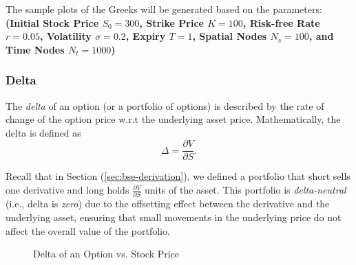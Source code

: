 The sample plots of the Greeks will be generated based on the parameters: 
\textbf{(Initial Stock Price $S_0 = 300$, Strike Price $K = 100$, Risk-free Rate $r = 0.05$, Volatility $\sigma = 0.2$, Expiry $T = 1$, Spatial Nodes $N_s = 100$, and Time Nodes  $N_t = 1000$)}

\subsubsection{Delta}
The \textit{delta} of an option (or a portfolio of options) is described by the rate of change of the option price w.r.t the underlying asset price. Mathematically, the delta is defined as
\begin{equation}
    \Delta = \frac{\partial V}{\partial S}.
\end{equation}

Recall that in Section (\ref{sec:bse-derivation}), we defined a portfolio that short sells one derivative and long holds $\frac{\partial V}{\partial S}$ units of the asset. 
This portfolio is \textit{delta-neutral} (i.e., delta is \textit{zero}) due to the offsetting effect between the derivative and the underlying asset, ensuring that small movements in the underlying price do not affect the overall value of the portfolio.
\begin{figure}[H]
    \centering
    \caption{Delta of an Option vs. Stock Price}
    \label{fig:delta-plot}
\end{figure}


